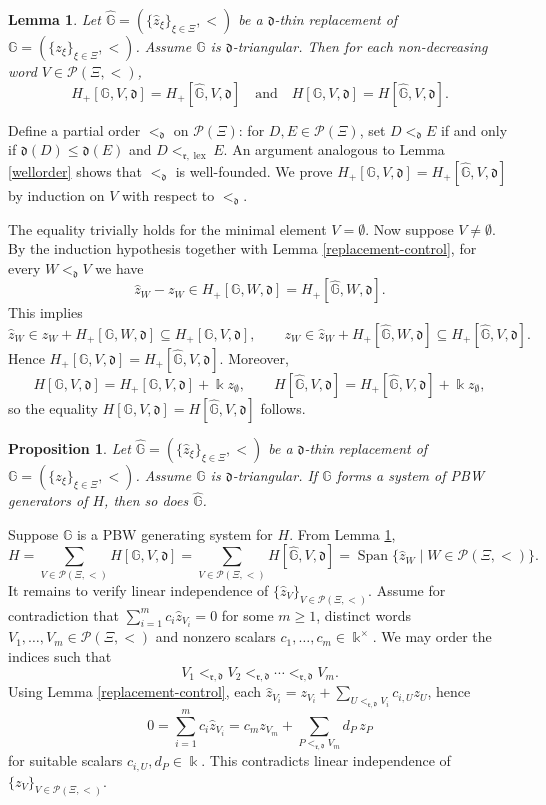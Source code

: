 \documentclass{article}
\makeatletter
\renewenvironment{proof}[1][\proofname]{\par
	\pushQED{\qed}%
	\normalfont \topsep6\p@\@plus6\p@\relax
	\trivlist
	\item[\hskip\labelsep
	\bfseries
	#1\@addpunct{.}]\ignorespaces
}{%
	\popQED\endtrivlist\@endpefalse
}
\theoremstyle{plain}
\newtheorem{prop}[thm]{Proposition}
\newtheorem{lemma}[thm]{Lemma}
\theoremstyle{definition}
\numberwithin{equation}{section}
\DeclareMathOperator{\Span}{Span}
\DeclareMathOperator{\lex}{lex}
\newcommand{\GG}{\mathbb{G}}
\newcommand{\dd}{\mathfrak{d}}
\newcommand{\rr}{\mathfrak{r}}
\makeatother
\begin{document}
	\begin{lemma}\label{equality of H}
		Let $\hat{\GG}=(\{\hat{z}_{\xi}\}_{\xi\in \Xi}, <)$ be a $\dd$-thin replacement of $\GG=(\{z_{\xi}\}_{\xi\in \Xi}, <)$. Assume $\GG$ is $\dd$-triangular. Then for each non-decreasing word $V\in \mathcal{P}(\Xi, <)$,
		\[
		H_{+}[\GG,V,\dd]=H_{+}[\hat{\GG},V,\dd]
		\quad \text{and} \quad
		H[\GG,V,\dd]=H[\hat{\GG},V,\dd].
		\]
	\end{lemma}
	\begin{proof}
		Define a partial order $<_{\dd}$ on $\mathcal{P}(\Xi)$: for $D, E\in \mathcal{P}(\Xi)$, set $D<_{\dd} E$ if and only if $\dd(D) \leq \dd(E)$ and $D <_{\rr,\lex} E$. An argument analogous to Lemma \ref{wellorder} shows that $<_{\dd}$ is well-founded. We prove $H_{+}[\GG,V,\dd]=H_{+}[\hat{\GG},V,\dd]$ by induction on $V$ with respect to $<_{\dd}$.
		
		The equality trivially holds for the minimal element $V=\emptyset$. Now suppose $V\neq \emptyset$. By the induction hypothesis together with Lemma \ref{replacement-control}, for every $W <_{\dd} V$ we have
		\[
		\hat{z}_{W} - z_{W} \in H_{+}[\GG,W,\dd] = H_{+}[\hat{\GG},W,\dd].
		\]
		This implies
		\[
		\hat{z}_{W} \in z_{W}+ H_{+}[\GG,W,\dd] \subseteq H_{+}[\GG,V,\dd],\qquad
		z_{W} \in \hat{z}_{W} + H_{+}[\hat{\GG},W,\dd] \subseteq H_{+}[\hat{\GG},V,\dd].
		\]
		Hence $H_{+}[\GG,V,\dd]=H_{+}[\hat{\GG},V,\dd]$. Moreover,
		\[
		H[\GG,V,\dd] = H_{+}[\GG,V,\dd] + \Bbbk z_{\emptyset},\qquad
		H[\hat{\GG},V,\dd] = H_{+}[\hat{\GG},V,\dd] + \Bbbk z_{\emptyset},
		\]
		so the equality $H[\GG,V,\dd]=H[\hat{\GG},V,\dd]$ follows.
	\end{proof}
	
	\begin{prop}\label{replacement facts}
		Let $\hat{\GG}=(\{\hat{z}_{\xi}\}_{\xi\in \Xi}, <)$ be a $\dd$-thin replacement of $\GG=(\{z_{\xi}\}_{\xi\in \Xi}, <)$. Assume $\GG$ is $\dd$-triangular. If $\GG$ forms a system of PBW generators of $H$, then so does $\hat{\GG}$.
	\end{prop}
	
	\begin{proof}
		Suppose $\GG$ is a PBW generating system for $H$. From Lemma \ref{equality of H},
		\[
		H=\sum_{V\in \mathcal{P}(\Xi,<)} H[\GG, V, \dd] = \sum_{V\in \mathcal{P}(\Xi,<)} H[\hat{\GG}, V, \dd] = \Span \{\hat{z}_{W} \mid W\in \mathcal{P}(\Xi,<)\}.
		\]
		It remains to verify linear independence of $\{\hat{z}_{V}\}_{V\in\mathcal{P}(\Xi,<)}$. Assume for contradiction that $\sum_{i=1}^{m}c_{i} \hat{z}_{V_{i}}=0$ for some $m\geq 1$, distinct words $V_{1},\dots,V_{m} \in \mathcal{P}(\Xi,<)$ and nonzero scalars $c_{1},\dots,c_{m} \in \Bbbk^{\times}$. We may order the indices such that
		\[
		V_{1}<_{\rr,\dd}V_{2}<_{\rr,\dd} \cdots <_{\rr,\dd}V_{m}.
		\]
		Using Lemma \ref{replacement-control}, each $\hat{z}_{V_i}=z_{V_i}+\sum_{U<_{\rr,\dd}V_i}c_{i,U}z_{U}$, hence
		\[
		0=\sum_{i=1}^{m} c_{i} \hat{z}_{V_{i}}
		= c_{m} z_{V_{m}} + \sum_{P<_{\rr,\dd}V_{m}} d_{P}\,z_{P}
		\]
		for suitable scalars $c_{i,U},d_{P} \in \Bbbk$. This contradicts linear independence of $\{z_{V}\}_{V\in\mathcal{P}(\Xi,<)}$.
	\end{proof}
	
\end{document}
